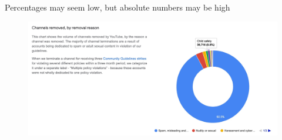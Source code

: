 \documentclass[nobackground,dvipsnames,table,aspectratio=169]{beamer}
\begin{document}
\begin{frame}{Percentages may seem low, but absolute numbers may be high}
    \begin{figure}
        \centering
        \includegraphics[width=\textwidth]{low-percentage-high-absolute}
    \end{figure}
\end{frame}
\end{document}
